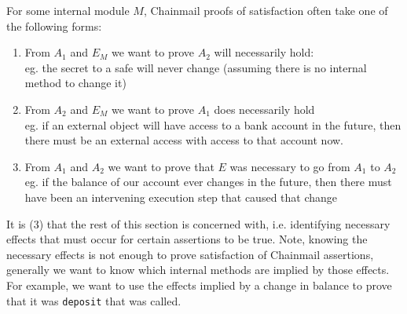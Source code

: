 \documentclass[12pt]{article}
\begin{document}
For some internal module $M$, Chainmail proofs of satisfaction often take one of the following forms:
\begin{enumerate}
\item
From $A_1$ and $E_M$ we want to prove $A_2$ will necessarily hold:\\
eg. the secret to a safe will never change (assuming there is no internal method to change it)
\item
From $A_2$ and $E_M$ we want to prove $A_1$ does necessarily hold\\
eg. if an external object will have access to a bank account in the future, then there must be an external access with access to that account now.
\item
From $A_1$ and $A_2$ we want to prove that $E$ was necessary to go from $A_1$ to $A_2$\\
eg. if the balance of our account ever changes in the future, then there must have been an intervening execution step that caused 
that change
\end{enumerate}
It is (3) that the rest of this section is concerned with, i.e. identifying necessary effects that must occur for certain 
assertions to be true. Note, knowing the necessary effects is not enough to prove satisfaction of Chainmail 
assertions, generally we want to know which internal methods are implied by those effects. For 
example, we want to use the effects implied by a change in balance to prove that it was 
\texttt{deposit} that was called. 
\end{document}
